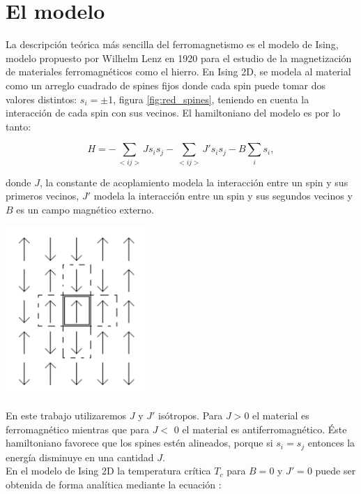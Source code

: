 \documentclass[%
 reprint,
 amsmath,amssymb,
 aps,
spanish]{revtex4-1}
\begin{document}
\section{El modelo}
La descripción teórica más sencilla del ferromagnetismo es el modelo de Ising, modelo propuesto por Wilhelm Lenz en 1920 para el estudio de la magnetización de materiales ferromagnéticos 
como el hierro. En Ising 2D, se modela al material como un arreglo cuadrado de spines fijos donde cada spin puede tomar dos valores distintos: $s_i= \pm$1, figura \ref{fig:red_spines}, teniendo en 
cuenta la interacción de cada spin con sus vecinos. El hamiltoniano del modelo es por lo tanto:

\begin{equation}
H=-\sum_{<ij>}{Js_is_j}-\sum_{<ij>}{J's_is_j}-B\sum_{i}{s_i},
\label{hamiltoniano}
\end{equation}

donde $J$, la constante de acoplamiento modela la interacción entre un spin y sus primeros vecinos, $J'$ modela la interacción entre un spin y sus segundos vecinos y $B$ es un campo magnético 
externo. 

\begin{minipage}{0.45\textwidth}									
\centering
\includegraphics[width=0.4\textwidth]{imagenes/red_spines}
\label{fig:red_spines}
\end{minipage}

En este trabajo utilizaremos $J$ y $J'$ isótropos. Para $J>0$ el material es ferromagnético mientras que para $J<$ 0 el material es antiferromagnético. Éste hamiltoniano favorece que 
los spines estén alineados, porque si $s_i=s_j$ entonces la energía disminuye en una cantidad $J$.\\
En el modelo de Ising 2D la temperatura crítica $T_c$ para $B=0$ y $J'=0$ puede ser obtenida de forma analítica mediante la ecuación \cite{onsager}:
\end{document}
